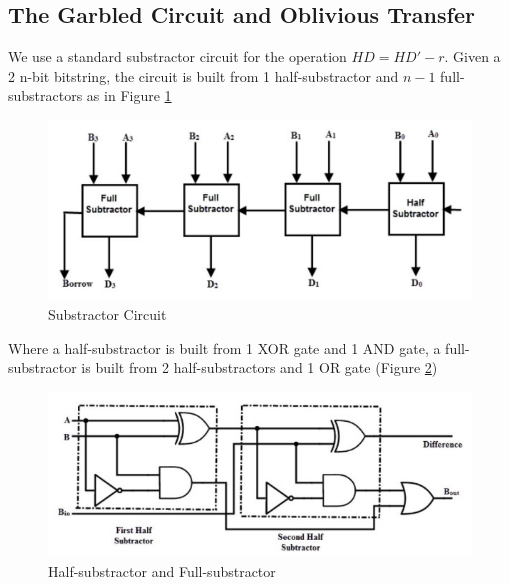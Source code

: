 \subsection{The Garbled Circuit and Oblivious Transfer}
We use a standard substractor circuit for the operation \(HD = HD' - r\). Given a 2
n-bit bitstring, the circuit is built from 1 half-substractor and \(n-1\)
full-substractors as in Figure \ref{fig:substractor}

\begin{figure}[htbp!] 
  \centering    
  \includegraphics[width=1.0\textwidth]{Chapter7/Figs/Raster/subCircuit}
  \caption{Substractor Circuit}
  \label{fig:substractor}
\end{figure}

Where a half-substractor is built from 1 XOR gate and 1 AND gate, a full-substractor is built from 2 half-substractors and 1 OR gate (Figure \ref{fig:fullSubstractor})

\begin{figure}[htbp!] 
  \centering    
  \includegraphics[width=1.0\textwidth]{Chapter7/Figs/Raster/fullSubstractor}
  \caption{Half-substractor and Full-substractor}
  \label{fig:fullSubstractor}
\end{figure}

